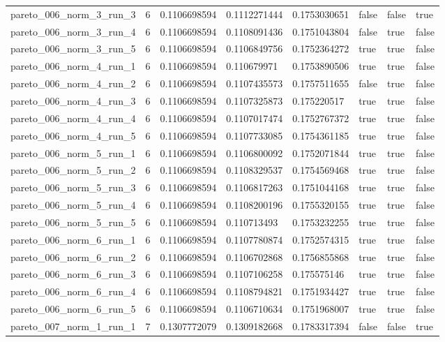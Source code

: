 \begin{tabular}{@{}llllllll@{}}
pareto\_006\_norm\_3\_run\_3 & 6 & 0.1106698594 & 0.1112271444 & 0.1753030651 & false & false & true \\
pareto\_006\_norm\_3\_run\_4 & 6 & 0.1106698594 & 0.1108091436 & 0.1751043804 & false & true & false \\
pareto\_006\_norm\_3\_run\_5 & 6 & 0.1106698594 & 0.1106849756 & 0.1752364272 & true & true & false \\
pareto\_006\_norm\_4\_run\_1 & 6 & 0.1106698594 & 0.110679971 & 0.1753890506 & true & true & false \\
pareto\_006\_norm\_4\_run\_2 & 6 & 0.1106698594 & 0.1107435573 & 0.1757511655 & false & true & false \\
pareto\_006\_norm\_4\_run\_3 & 6 & 0.1106698594 & 0.1107325873 & 0.175220517 & true & true & false \\
pareto\_006\_norm\_4\_run\_4 & 6 & 0.1106698594 & 0.1107017474 & 0.1752767372 & true & true & false \\
pareto\_006\_norm\_4\_run\_5 & 6 & 0.1106698594 & 0.1107733085 & 0.1754361185 & true & true & false \\
pareto\_006\_norm\_5\_run\_1 & 6 & 0.1106698594 & 0.1106800092 & 0.1752071844 & true & true & false \\
pareto\_006\_norm\_5\_run\_2 & 6 & 0.1106698594 & 0.1108329537 & 0.1754569468 & true & true & false \\
pareto\_006\_norm\_5\_run\_3 & 6 & 0.1106698594 & 0.1106817263 & 0.1751044168 & true & true & false \\
pareto\_006\_norm\_5\_run\_4 & 6 & 0.1106698594 & 0.1108200196 & 0.1755320155 & true & true & false \\
pareto\_006\_norm\_5\_run\_5 & 6 & 0.1106698594 & 0.110713493 & 0.1753232255 & true & true & false \\
pareto\_006\_norm\_6\_run\_1 & 6 & 0.1106698594 & 0.1107780874 & 0.1752574315 & true & true & false \\
pareto\_006\_norm\_6\_run\_2 & 6 & 0.1106698594 & 0.1106702868 & 0.1756855868 & true & true & false \\
pareto\_006\_norm\_6\_run\_3 & 6 & 0.1106698594 & 0.1107106258 & 0.175575146 & true & true & false \\
pareto\_006\_norm\_6\_run\_4 & 6 & 0.1106698594 & 0.1108794821 & 0.1751934427 & true & true & false \\
pareto\_006\_norm\_6\_run\_5 & 6 & 0.1106698594 & 0.1106710634 & 0.1751968007 & true & true & false \\
pareto\_007\_norm\_1\_run\_1 & 7 & 0.1307772079 & 0.1309182668 & 0.1783317394 & false & false & true \\

\end{tabular}
